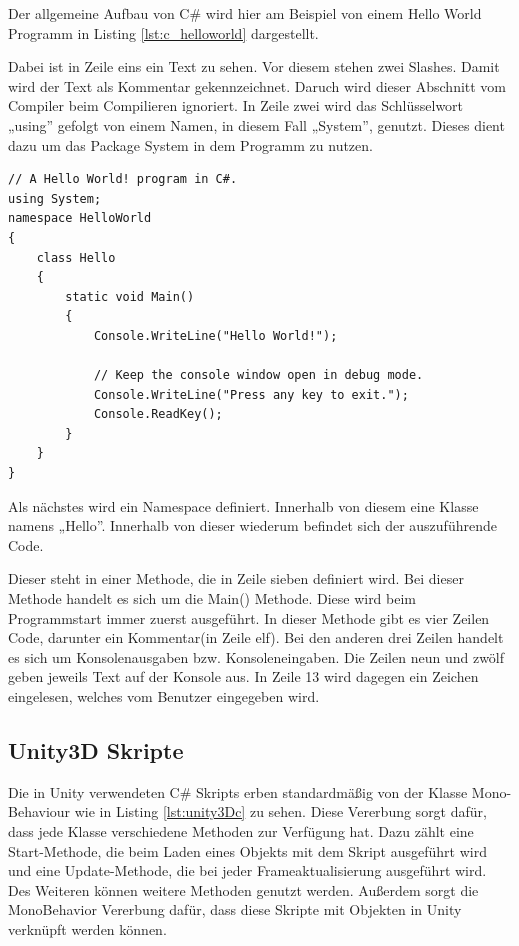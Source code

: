Der allgemeine Aufbau von C\# wird hier am Beispiel von einem Hello World Programm in Listing \ref{lst:c_helloworld} dargestellt. 

Dabei ist in Zeile eins ein Text zu sehen. Vor diesem stehen zwei Slashes. Damit wird der Text als Kommentar gekennzeichnet. Daruch wird dieser Abschnitt vom Compiler beim Compilieren ignoriert. In Zeile zwei wird das Schlüsselwort „using” gefolgt von einem Namen, in diesem Fall „System”, genutzt. Dieses dient dazu um das Package System in dem Programm zu nutzen.

\begin{scriptsize}
\lstset{
	float,
	caption=Hello World in C\#, 
	language=[Sharp]C, 
	frame=single,  
	showstringspaces=false, 
	showspaces=false, 
	numbers=left, 
	captionpos=b, 
	belowcaptionskip=4pt,
	basicstyle=\ttfamily
} 

\begin{lstlisting}[label=lst:c_helloworld]
// A Hello World! program in C#.
using System;
namespace HelloWorld
{
    class Hello 
    {
        static void Main() 
        {
            Console.WriteLine("Hello World!");

            // Keep the console window open in debug mode.
            Console.WriteLine("Press any key to exit.");
            Console.ReadKey();
        }
    }
}
\end{lstlisting}
\end{scriptsize}

Als nächstes wird ein Namespace definiert. Innerhalb von diesem eine Klasse namens „Hello”. Innerhalb von dieser wiederum befindet sich der auszuführende Code.

Dieser steht in einer Methode, die in Zeile sieben definiert wird. Bei dieser Methode handelt es sich um die Main() Methode. Diese wird beim Programmstart immer zuerst ausgeführt. In dieser Methode gibt es vier Zeilen Code, darunter ein Kommentar(in Zeile elf). Bei den anderen drei Zeilen handelt es sich um Konsolenausgaben bzw. Konsoleneingaben. Die Zeilen neun und zwölf geben jeweils Text auf der Konsole aus. In Zeile 13 wird dagegen ein Zeichen eingelesen, welches vom Benutzer eingegeben wird.

\subsection{Unity3D Skripte}

Die in Unity verwendeten C\# Skripts erben standardmäßig von der Klasse Mono-Behaviour wie in Listing \ref{lst:unity3Dc} zu sehen. Diese Vererbung sorgt dafür, dass jede Klasse verschiedene Methoden zur Verfügung hat. Dazu zählt eine Start-Methode, die beim Laden eines Objekts mit dem Skript ausgeführt wird und eine Update-Methode, die bei jeder Frameaktualisierung ausgeführt wird. Des Weiteren können weitere Methoden genutzt werden. Außerdem sorgt die MonoBehavior Vererbung dafür, dass diese Skripte mit Objekten in Unity verknüpft werden können.

